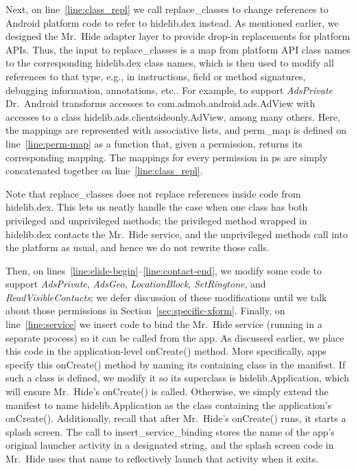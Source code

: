 \documentclass[preprint]{sig-alternate-10pt}
\newcommand{\code}[1]{\textsf{#1}}
\newcommand{\lib}{Mr.\ Hide\xspace}
\newcommand{\rewriter}{Dr.\ Android\xspace}
\newcommand{\perm}[1]{\textsf{\textit{#1}}}
\newcommand{\polAdsBlindName}{\perm{AdsPrivate}\xspace}
\begin{document}
Next, on line~\ref{line:class_repl} we call \code{replace\_classes} to
change references to Android platform code to refer to
\code{hidelib.dex} instead. As mentioned earlier, we designed the \lib
adapter layer to
provide drop-in replacements for platform APIs. Thus, the
input to \code{replace\_classes} is a map from platform API
class names to the corresponding \code{hidelib.dex} class names, which is then used
to modify all references to that type, e.g., in instructions, field or
method signatures, debugging information, annotations, etc..
For example, to support \polAdsBlindName
\rewriter transforms accesses to
\code{com.admob.android.ads.AdView} with accesses to a class
\code{hidelib.ads.clientsideonly.AdView}, among many others.
Here, the mappings are represented with associative
lists, and \code{perm\_map} is defined on line~\ref{line:perm-map} as a
function that, given a permission, returns its corresponding
mapping. The mappings for every permission in \code{ps} are
simply concatenated together on line~\ref{line:class_repl}.

Note that \code{replace\_classes} does not replace references inside
code from \code{hidelib.dex}. This lets us neatly handle the case when
one class has both privileged and unprivileged methods; the privileged
method wrapped in \code{hidelib.dex} contacts the \lib service, and the
unprivileged methods call into the platform as usual, and hence we do
not rewrite those calls. %

Then, on lines~\ref{line:elide-begin}--\ref{line:contact-end}, we
modify some code to support \perm{AdsPrivate}, \perm{AdsGeo},
\perm{LocationBlock}, \perm{SetRingtone}, and \perm{ReadVisibleContacts}; we defer discussion of these
modifications until we talk about those permissions in
Section~\ref{sec:specific-xform}.
Finally, on line~\ref{line:service} we insert code to bind the
\lib service (running in a separate process) so it can be called
from the app. As discussed earlier, we place this code in the
application-level \code{onCreate()} method.
More specifically, apps specify this
\code{onCreate()} method by naming its containing class in the
manifest. If such a class is defined, we modify it so
its superclass is \code{hidelib.Application},
which will ensure \lib's \code{onCreate()} is called.
Otherwise, we simply extend the manifest to name
\code{hidelib.Application} as the class containing the
application's \code{onCreate()}. Additionally, recall that after \lib's
\code{onCreate()} runs, it starts a splash screen.
The call to \code{insert\_service\_binding} stores the name of the
app's original launcher activity in a designated string, and the
splash screen code in \lib{} uses that name to reflectively launch
that activity when it exits.
\end{document}
